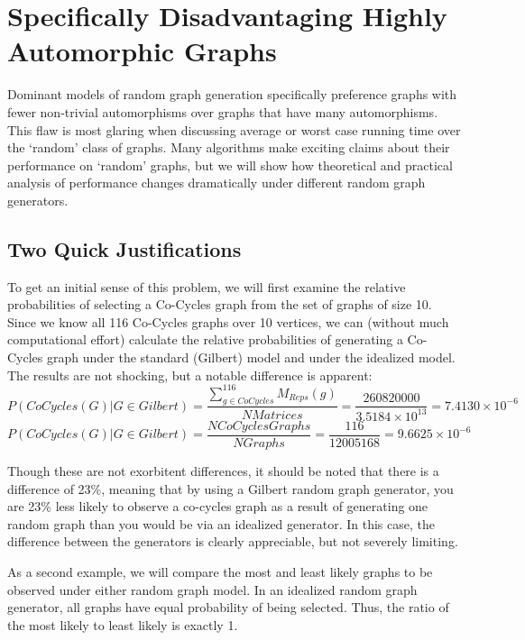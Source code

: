 
\section{Specifically Disadvantaging Highly Automorphic Graphs}

Dominant models of random graph generation specifically preference graphs with fewer non-trivial automorphisms over graphs that have many automorphisms. 
This flaw is most glaring when discussing average or worst case running time over the `random' class of graphs.
Many algorithms make exciting claims about their performance on `random' graphs, but
we will show how theoretical and practical analysis of performance changes dramatically under different random graph generators.

\subsection{Two Quick Justifications}

To get an initial sense of this problem, we will first examine the relative probabilities of selecting a Co-Cycles graph from the set of graphs of size 10.
Since we know all 116 Co-Cycles graphs over 10 vertices, we can (without much computational effort) calculate the relative probabilities of generating a Co-Cycles graph under the standard (Gilbert) model and under the idealized model.
The results are not shocking, but a notable difference is apparent:
$$P(CoCycles(G) | G \in Gilbert) = \frac{\sum_{g \in CoCycles}^{116}M_{Reps}(g)}{N Matrices} = \frac{260820000}{3.5184 \times 10^{13}} = 7.4130 \times 10^{-6}$$
$$P(CoCycles(G) | G \in Gilbert) = \frac{N CoCycles Graphs}{N Graphs} = \frac{116}{12005168} = 9.6625 \times 10^{-6}$$

Though these are not exorbitent differences, it should be noted that there is a difference of 23\%, meaning that by using a Gilbert random graph generator, you are 23\% less likely to observe a co-cycles graph as a result of generating one random graph than you would be via an idealized generator.
In this case, the difference between the generators is clearly appreciable, but not severely limiting.

As a second example, we will compare the most and least likely graphs to be observed under either random graph model.
In an idealized random graph generator, all graphs have equal probability of being selected.
Thus, the ratio of the most likely to least likely is exactly 1.

